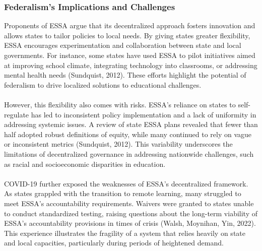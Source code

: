 \documentclass[11pt]{extarticle}
\begin{document}
\subsubsection{Federalism's Implications and Challenges}
Proponents of ESSA argue that its decentralized approach fosters innovation and allows states to tailor policies to local needs. 
By giving states greater flexibility, ESSA encourages experimentation and collaboration between state and local governments. 
For instance, some states have used ESSA to pilot initiatives aimed at improving school climate, integrating technology into classrooms, or addressing mental health needs (Sundquist, 2012). These efforts highlight the potential of federalism to drive localized solutions to educational challenges.\\
\\
However, this flexibility also comes with risks. ESSA’s reliance on states to self-regulate has led to inconsistent policy implementation and a lack of uniformity in addressing systemic issues. A review of state ESSA plans revealed that fewer than half adopted robust definitions of equity, while many continued to rely on vague or inconsistent metrics (Sundquist, 2012). This variability underscores the limitations of decentralized governance in addressing nationwide challenges, such as racial and socioeconomic disparities in education.\\
\\
COVID-19 further exposed the weaknesses of ESSA’s decentralized framework. As states grappled with the transition to remote learning, many struggled to meet ESSA’s accountability requirements. Waivers were granted to states unable to conduct standardized testing, raising questions about the long-term viability of ESSA’s accountability provisions in times of crisis (Walsh, Moynihan, Yin, 2022). This experience illustrates the fragility of a system that relies heavily on state and local capacities, particularly during periods of heightened demand.
\end{document}
